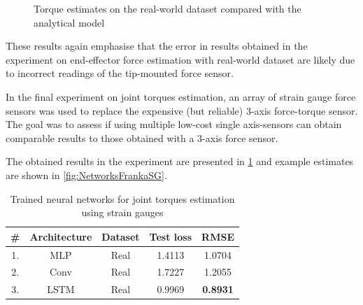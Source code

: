 \begin{figure}
    \hfill
    \caption{Torque estimates on the real-world dataset compared with the analytical model}
    \label{fig:NetworksFrankaTorqueReal}
\end{figure}

These results again emphasise that the error in results obtained in the experiment on end-effector force estimation with real-world dataset are likely due to incorrect readings of the tip-mounted force sensor.

In the final experiment on joint torques estimation, an array of strain gauge force sensors was used to replace the expensive (but reliable) 3-axis force-torque sensor. The goal was to assess if using multiple low-cost single axis-sensors can obtain comparable results to those obtained with a 3-axis force sensor. 

The obtained results in the experiment are presented in \cref{tab:NetworksFrankaTorqueSG} and example estimates are shown in \cref{fig:NetworksFrankaSG}. 

\begin{table}
    \centering
    \caption{Trained neural networks for joint torques estimation using strain gauges}
    \label{tab:NetworksFrankaTorqueSG}
    \begin{tabular}{ccccc}
        \toprule
        \textbf{\#} & \textbf{Architecture} & \textbf{Dataset} & \textbf{Test loss} & \textbf{RMSE} \\
        \midrule
        1. & MLP & Real & 1.4113 & 1.0704\\%
        2. & Conv & Real & 1.7227 & 1.2055\\ %
        3. & LSTM & Real & 0.9969 &\textbf{0.8931}\\ %
        \bottomrule
    \end{tabular}
\end{table}

